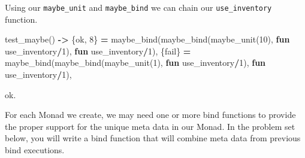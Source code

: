 \documentclass[
]{book}
\newenvironment{Shaded}{\begin{snugshade}}{\end{snugshade}}
\newcommand{\CharTok}[1]{\textcolor[rgb]{0.31,0.60,0.02}{#1}}
\newcommand{\DecValTok}[1]{\textcolor[rgb]{0.00,0.00,0.81}{#1}}
\newcommand{\FunctionTok}[1]{\textcolor[rgb]{0.00,0.00,0.00}{#1}}
\newcommand{\KeywordTok}[1]{\textcolor[rgb]{0.13,0.29,0.53}{\textbf{#1}}}
\newcommand{\OperatorTok}[1]{\textcolor[rgb]{0.81,0.36,0.00}{\textbf{#1}}}
\begin{document}
Using our \texttt{maybe\_unit} and \texttt{maybe\_bind} we can chain our \texttt{use\_inventory} function.

\begin{Shaded}
\begin{Highlighting}[]
\FunctionTok{test\_maybe()} \OperatorTok{{-}\textgreater{}}
    \FunctionTok{\{}\CharTok{ok}\FunctionTok{,} \DecValTok{8}\FunctionTok{\}} \OperatorTok{=} \FunctionTok{maybe\_bind(maybe\_bind(maybe\_unit(}\DecValTok{10}\FunctionTok{),} \KeywordTok{fun} \CharTok{use\_inventory}\OperatorTok{/}\DecValTok{1}\FunctionTok{),} \KeywordTok{fun} \CharTok{use\_inventory}\OperatorTok{/}\DecValTok{1}\FunctionTok{),}
    \FunctionTok{\{}\CharTok{fail}\FunctionTok{\}} \OperatorTok{=} \FunctionTok{maybe\_bind(maybe\_bind(maybe\_unit(}\DecValTok{1}\FunctionTok{),} \KeywordTok{fun} \CharTok{use\_inventory}\OperatorTok{/}\DecValTok{1}\FunctionTok{),} \KeywordTok{fun} \CharTok{use\_inventory}\OperatorTok{/}\DecValTok{1}\FunctionTok{),}
   
    \CharTok{ok}\FunctionTok{.}
\end{Highlighting}
\end{Shaded}

For each Monad we create, we may need one or more bind functions to provide the proper support for the unique meta data in our Monad. In the problem set below, you will write a bind function that will combine meta data from previous bind executions.
\end{document}
